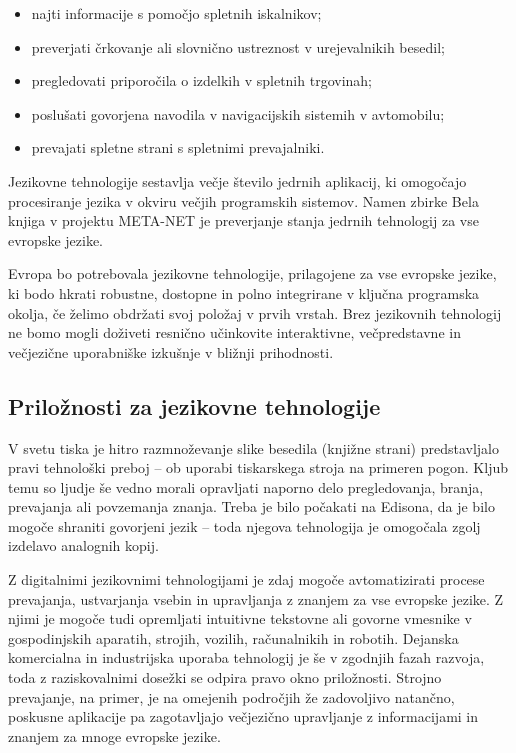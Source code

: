 \begin{multicols}{2}
\begin{itemize}
\item najti informacije s pomočjo spletnih iskalnikov;
\item preverjati črkovanje ali slovnično ustreznost v urejevalnikih besedil;
\item pregledovati priporočila o izdelkih v spletnih trgovinah;
\item poslušati go\-vorjena navodila v navigacij\-skih sistemih v avtomobilu;
\item prevajati spletne strani s spletnimi prevajalniki.
\end{itemize}

Jezikovne tehnologije sestav\-lja večje število jedrnih aplikacij, ki omogočajo procesiranje jezika v okviru večjih programskih sistemov. Namen zbirke Bela knjiga v projektu META-NET je preverjanje stanja jedrnih tehnologij za vse evropske jezike. 

Evropa bo potrebovala jezikovne tehnologije, prilagojene za vse evropske jezike, ki bodo hkrati robustne, dostopne in polno integrirane v ključna programska okolja, če želimo obdržati svoj položaj v prvih vrstah. Brez jezikovnih tehnologij ne bomo mogli doživeti resnično učinkovite interaktivne, večpredstavne in večjezične uporabniške izkušnje v bližnji prihodnosti.

\subsection{Priložnosti za jezikovne tehnologije}

V svetu tiska  je hitro razmnoževanje slike besedila (knjižne strani) predstav\-ljalo pravi tehnološki preboj – ob uporabi tiskarskega stroja na primeren pogon. Kljub temu so ljudje še vedno morali oprav\-ljati naporno delo pregledovanja, branja, prevajanja ali povzemanja znanja. Treba je bilo počakati na Edisona, da je bilo mogoče shraniti go\-vorjeni jezik – toda njegova tehnologija je omogočala zgolj izdelavo analognih kopij.

Z digitalnimi jezikovnimi tehnologijami je zdaj mogoče avtomatizirati procese prevajanja, ustvarjanja vsebin in uprav\-ljanja z znanjem za vse evropske jezike. Z njimi je mogoče tudi oprem\-ljati intuitivne tekstovne ali go\-vorne vmesnike v gospodinjskih aparatih, stro\-jih, vozilih, računalnikih in robotih. Dejanska komercialna in industrijska uporaba tehnologij je še v zgodnjih fazah razvoja, toda z raziskovalnimi dosežki se odpira pravo okno priložnosti. Stroj\-no prevajanje, na primer, je na omejenih področjih že zadovoljivo natančno, poskusne aplikacije pa zagotav\-ljajo večjezično uprav\-ljanje z informacijami in znanjem za mnoge evropske jezike. 


\end{multicols}
